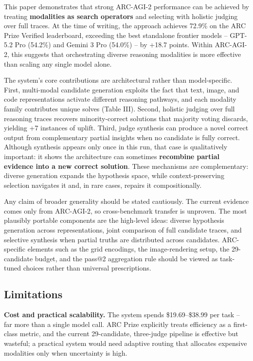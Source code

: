 \documentclass[conference]{IEEEtran}
\begin{document}
This paper demonstrates that strong ARC-AGI-2 performance can be
achieved by treating \textbf{modalities as search operators} and
selecting with holistic judging over full traces. At the time of
writing, the approach achieves 72.9\% on the ARC Prize Verified
leaderboard, exceeding the best standalone frontier models -- GPT-5.2
Pro (54.2\%) and Gemini 3 Pro (54.0\%) -- by +18.7 points. Within
ARC-AGI-2, this suggests that orchestrating diverse reasoning modalities
is more effective than scaling any single model alone.

The system's core contributions are architectural rather than
model-specific. First, multi-modal candidate generation exploits the
fact that text, image, and code representations activate different
reasoning pathways, and each modality family contributes unique solves
(Table III). Second, holistic judging over full reasoning traces
recovers minority-correct solutions that majority voting discards,
yielding +7 instances of uplift. Third, judge synthesis can produce a
novel correct output from complementary partial insights when no
candidate is fully correct. Although synthesis appears only once in this
run, that case is qualitatively important: it shows the architecture can
sometimes \textbf{recombine partial evidence into a new correct
solution}. These mechanisms are complementary: diverse generation
expands the hypothesis space, while context-preserving selection
navigates it and, in rare cases, repairs it compositionally.

Any claim of broader generality should be stated cautiously. The current
evidence comes only from ARC-AGI-2, so cross-benchmark transfer is
unproven. The most plausibly portable components are the high-level
ideas: diverse hypothesis generation across representations, joint
comparison of full candidate traces, and selective synthesis when
partial truths are distributed across candidates. ARC-specific elements
such as the grid encodings, the image-rendering setup, the 29-candidate
budget, and the pass@2 aggregation rule should be viewed as task-tuned
choices rather than universal prescriptions.

\subsection{Limitations}\label{limitations}

\textbf{Cost and practical scalability.} The system spends
\$19.69--\$38.99 per task -- far more than a single model call. ARC
Prize explicitly treats efficiency as a first-class metric, and the
current 29-candidate, three-judge pipeline is effective but wasteful; a
practical system would need adaptive routing that allocates expensive
modalities only when uncertainty is high.
\end{document}

